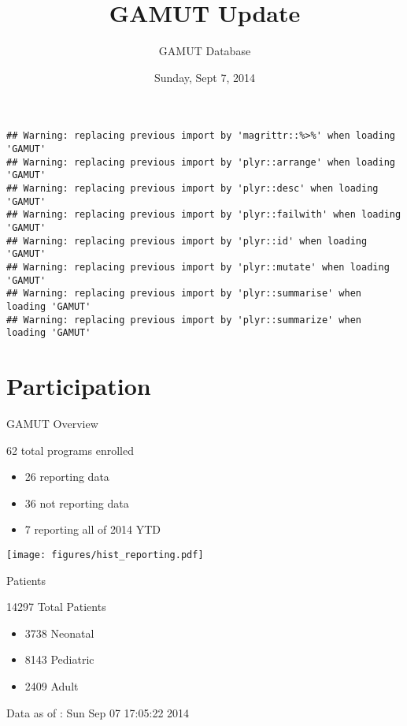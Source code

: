 \documentclass[ignorenonframetext,]{beamer}
\title{GAMUT Update}
\author{GAMUT Database}
\date{Sunday, Sept 7, 2014}
\makeatletter
\def\maxwidth{\ifdim\Gin@nat@width>\linewidth\linewidth\else\Gin@nat@width\fi}
\def\maxheight{\ifdim\Gin@nat@height>\textheight0.8\textheight\else\Gin@nat@height\fi}
\renewcommand{\includegraphics}[2][]{%
    \Oldincludegraphics[#1,width=\maxwidth,height=\maxheight,keepaspectratio]{#2}}
\makeatother
\begin{document}
\frame{\titlepage}

\begin{frame}[fragile]

\begin{verbatim}
## Warning: replacing previous import by 'magrittr::%>%' when loading 'GAMUT'
## Warning: replacing previous import by 'plyr::arrange' when loading 'GAMUT'
## Warning: replacing previous import by 'plyr::desc' when loading 'GAMUT'
## Warning: replacing previous import by 'plyr::failwith' when loading 'GAMUT'
## Warning: replacing previous import by 'plyr::id' when loading 'GAMUT'
## Warning: replacing previous import by 'plyr::mutate' when loading 'GAMUT'
## Warning: replacing previous import by 'plyr::summarise' when loading 'GAMUT'
## Warning: replacing previous import by 'plyr::summarize' when loading 'GAMUT'
\end{verbatim}

\end{frame}

\section{Participation}\label{participation}

\begin{frame}{GAMUT Overview}

\begin{block}{62 total programs enrolled}

\begin{itemize}
\item
  26 reporting data\\
\item
  36 not reporting data
\item
  7 reporting all of 2014 YTD
\end{itemize}

\texttt{[image: figures/hist\_reporting.pdf]}

\end{block}

\end{frame}

\begin{frame}{Patients}

\begin{block}{14297 Total Patients}

\begin{itemize}
\itemsep1pt\parskip0pt
\item
  3738 Neonatal\\
\item
  8143 Pediatric\\
\item
  2409 Adult
\end{itemize}

Data as of : Sun Sep 07 17:05:22 2014

\end{block}

\end{frame}
\end{document}
